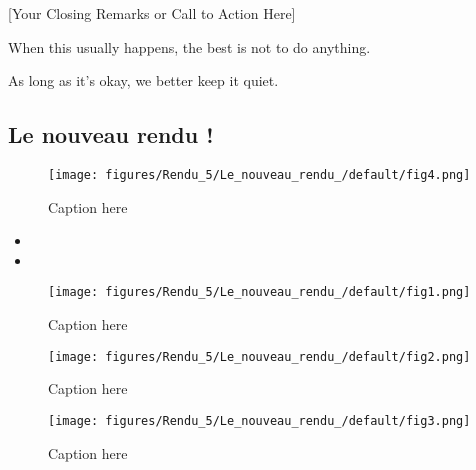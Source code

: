 \documentclass{mytex}
\begin{document}
[Your Closing Remarks or Call to Action Here]

When this usually happens, the best is not to do anything.

As long as it's okay, we better keep it quiet.




\subsection{Le nouveau rendu !}


\begin{figure}[h!]
    \centering
    \texttt{[image: figures/Rendu\_5/Le\_nouveau\_rendu\_/default/fig4.png]}
    \caption{Caption here}
    \label{fig:Rendu_5_Le_nouveau_rendu__4}
\end{figure}

\begin{itemize}
	\item
	\item
\end{itemize}



\begin{figure}[h!]
    \centering
    \texttt{[image: figures/Rendu\_5/Le\_nouveau\_rendu\_/default/fig1.png]}
    \caption{Caption here}
    \label{fig:Rendu_5_Le_nouveau_rendu__1}
\end{figure}
\begin{figure}[h!]
    \centering
    \texttt{[image: figures/Rendu\_5/Le\_nouveau\_rendu\_/default/fig2.png]}
    \caption{Caption here}
    \label{fig:Rendu_5_Le_nouveau_rendu__2}
\end{figure}


\begin{figure}[h!]
    \centering
    \texttt{[image: figures/Rendu\_5/Le\_nouveau\_rendu\_/default/fig3.png]}
    \caption{Caption here}
    \label{fig:Rendu_5_Le_nouveau_rendu__3}
\end{figure}

\merci
\end{document}
